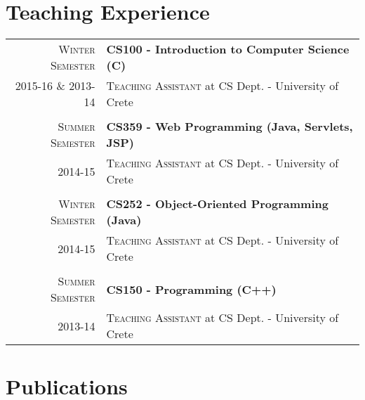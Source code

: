 \documentclass[11pt]{article}
\begin{document}
\begin{longtable}{rp{12cm}}


\end{longtable}

\section{Teaching Experience}

\begin{longtable}{r|p{12.5cm}}

\textsc{Winter Semester} & \textbf{CS100 - Introduction to Computer Science (C)}  \\
\textsc{2015-16 \& 2013-14} &\textsc{Teaching Assistant} at CS Dept. - University of Crete \\

\multicolumn{2}{c}{} \\
\textsc{Summer Semester} & \textbf{CS359 - Web Programming (Java, Servlets, JSP)}  \\
\textsc{2014-15} &\textsc{Teaching Assistant} at CS Dept. - University of Crete\\

\multicolumn{2}{c}{} \\
\textsc{Winter Semester} & \textbf{CS252 - Object-Oriented Programming (Java)}  \\
\textsc{2014-15} &\textsc{Teaching Assistant} at CS Dept. - University of Crete\\

\multicolumn{2}{c}{} \\
\textsc{Summer Semester} & \textbf{CS150 - Programming (C++)}  \\
\textsc{2013-14} &\textsc{Teaching Assistant} at CS Dept. - University of Crete\\

\end{longtable}

\section{Publications}
\end{document}
